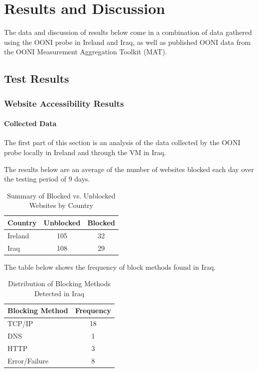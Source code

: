 \chapter{Results and Discussion}

The data and discussion of results below come in a combination of data gathered using the OONI probe in Ireland and Iraq, as well as published OONI data from the OONI Measurement Aggregation Toolkit (MAT).

\section{Test Results}

\subsection{Website Accessibility Results}

\subsubsection{Collected Data}

The first part of this section is an analysis of the data collected by the OONI probe locally in Ireland and through the VM in Iraq.

The results below are an average of the number of websites blocked each day over the testing period of 9 days.

\begin{table}[H]
\centering
\caption{Summary of Blocked vs. Unblocked Websites by Country}
\begin{tabular}{lcc}
\toprule
\textbf{Country} & \textbf{Unblocked} & \textbf{Blocked} \\
\midrule
Ireland & 105 & 32 \\
Iraq    & 108 & 29 \\   
\bottomrule
\end{tabular}
\label{tab:blocked_summary}
\end{table}

The table below shows the frequency of block methods found in Iraq.

\begin{table}[H]
\centering
\caption{Distribution of Blocking Methods Detected in Iraq}
\begin{tabular}{lc}
\toprule
\textbf{Blocking Method} & \textbf{Frequency} \\
\midrule
TCP/IP & 18 \\
DNS & 1 \\
HTTP & 3\\
Error/Failure & 8 \\
\bottomrule
\end{tabular}
\label{tab:iraq_blocking_methods}
\end{table}

